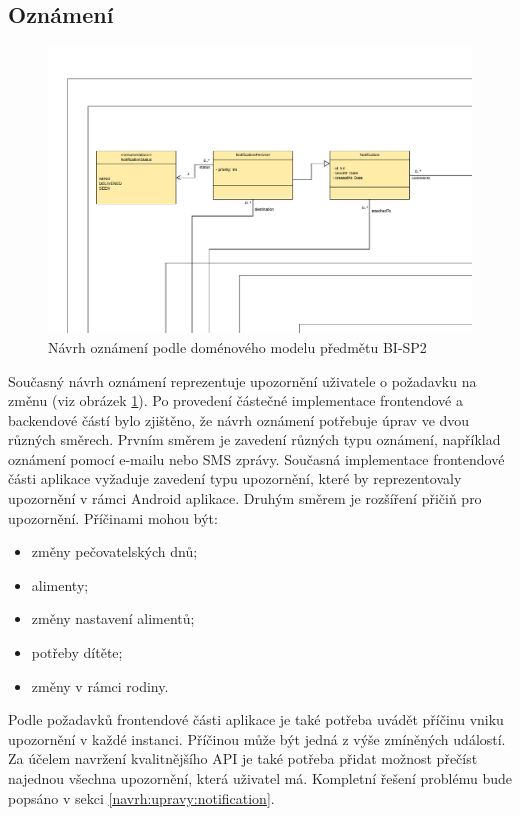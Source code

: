      \subsection{Oznámení}
        \begin{figure}\centering
            \includegraphics[width=1.0\textwidth]{pdfs/Notification1}
            \caption[Předchozí návrh oznámení]{Návrh oznámení podle doménového modelu předmětu BI-SP2}\label{image:notification1}
        \end{figure}
        Současný návrh oznámení reprezentuje upozornění uživatele o požadavku na změnu (viz obrázek \ref{image:notification1}). Po provedení částečné implementace frontendové a backendové částí bylo zjištěno, že návrh oznámení potřebuje úprav ve dvou různých směrech. Prvním směrem je zavedení různých typu oznámení, například oznámení pomocí e-mailu nebo SMS zprávy. Současná implementace frontendové části aplikace vyžaduje zavedení typu upozornění, které by reprezentovaly upozornění v rámci Android aplikace. 
        Druhým směrem je rozšíření přičiň pro upozornění. Příčinami mohou být:
        \begin{itemize}
            \item změny pečovatelských dnů;
            \item alimenty;
            \item změny nastavení alimentů;
            \item potřeby dítěte;
            \item změny v rámci rodiny.
        \end{itemize}
        Podle požadavků frontendové části aplikace je také potřeba uvádět příčinu vniku upozornění v každé instanci. Příčinou může být jedná z výše zmíněných událostí. Za účelem navržení kvalitnějšího API je také potřeba přidat možnost přečíst najednou všechna upozornění, která uživatel má. Kompletní řešení problému bude popsáno v sekci \ref{navrh:upravy:notification}.
        
